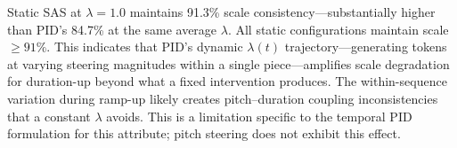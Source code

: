 \documentclass{article}
\theoremstyle{plain}
\begin{document}
Static SAS at $\lambda{=}1.0$ maintains 91.3\% scale consistency---substantially higher than PID's 84.7\% at the same average $\lambda$. All static configurations maintain scale $\geq 91\%$. This indicates that PID's dynamic $\lambda(t)$ trajectory---generating tokens at varying steering magnitudes within a single piece---amplifies scale degradation for duration-up beyond what a fixed intervention produces. The within-sequence variation during ramp-up likely creates pitch--duration coupling inconsistencies that a constant $\lambda$ avoids. This is a limitation specific to the temporal PID formulation for this attribute; pitch steering does not exhibit this effect.
\end{document}
